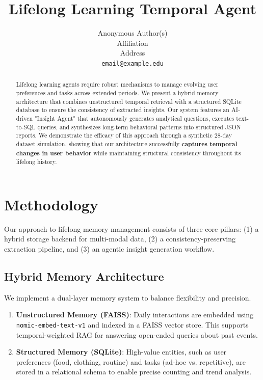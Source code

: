 \documentclass{article}
\title{Lifelong Learning Temporal Agent}
\author{%
  Anonymous Author(s) \\
  Affiliation \\
  Address \\
  \texttt{email@example.edu} \\
}
\begin{document}
\maketitle


\begin{abstract}
  Lifelong learning agents require robust mechanisms to manage evolving user preferences and tasks across extended periods. We present a hybrid memory architecture that combines unstructured temporal retrieval with a structured SQLite database to ensure the consistency of extracted insights. Our system features an AI-driven "Insight Agent" that autonomously generates analytical questions, executes text-to-SQL queries, and synthesizes long-term behavioral patterns into structured JSON reports. We demonstrate the efficacy of this approach through a synthetic 28-day dataset simulation, showing that our architecture successfully \textbf{captures temporal changes in user behavior} while maintaining structural consistency throughout its lifelong history.
\end{abstract}

\section{Methodology}

Our approach to lifelong memory management consists of three core pillars: (1) a hybrid storage backend for multi-modal data, (2) a consistency-preserving extraction pipeline, and (3) an agentic insight generation workflow.

\subsection{Hybrid Memory Architecture}
We implement a dual-layer memory system to balance flexibility and precision.
\begin{enumerate}
    \item \textbf{Unstructured Memory (FAISS)}: Daily interactions are embedded using \texttt{nomic-embed-text-v1} and indexed in a FAISS vector store. This supports temporal-weighted RAG for answering open-ended queries about past events.
    \item \textbf{Structured Memory (SQLite)}: High-value entities, such as user preferences (food, clothing, routine) and tasks (ad-hoc vs. repetitive), are stored in a relational schema to enable precise counting and trend analysis.
\end{enumerate}
\end{document}
